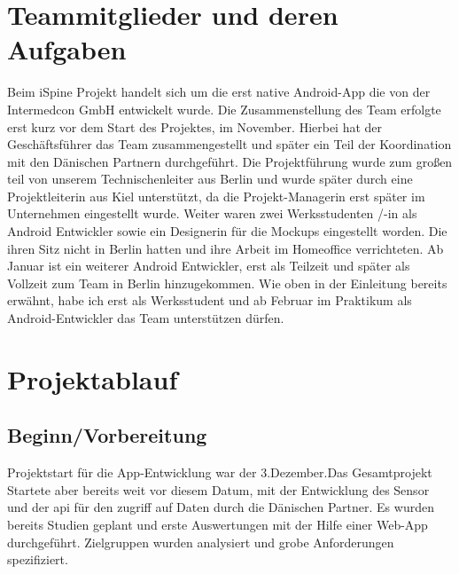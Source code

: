 
\section{Teammitglieder und deren Aufgaben}\label{team}
Beim iSpine Projekt handelt sich um die erst native Android-App die von der Intermedcon GmbH entwickelt wurde. Die Zusammenstellung des  Team erfolgte erst kurz vor dem Start des Projektes, im November. Hierbei hat der Geschäftsführer das Team zusammengestellt und später ein Teil der Koordination mit den Dänischen Partnern durchgeführt. Die Projektführung wurde zum großen teil von unserem Technischenleiter aus Berlin und wurde später durch eine Projektleiterin aus Kiel unterstützt, da  die Projekt-Managerin erst später im Unternehmen eingestellt wurde. Weiter waren  zwei Werksstudenten /-in als Android Entwickler sowie ein Designerin für die Mockups eingestellt worden. Die ihren Sitz nicht in Berlin hatten und ihre Arbeit im Homeoffice verrichteten. Ab Januar ist ein weiterer Android Entwickler, erst als Teilzeit und später als Vollzeit zum Team in Berlin hinzugekommen. Wie oben in der Einleitung bereits erwähnt, habe ich erst als Werksstudent und ab Februar im Praktikum als Android-Entwickler das Team unterstützen dürfen.
\section{Projektablauf}
\subsection{Beginn/Vorbereitung}\label{kapBegin}
Projektstart für die App-Entwicklung  war der 3.Dezember.Das Gesamtprojekt Startete aber bereits weit vor diesem Datum, mit der Entwicklung des Sensor und der \ac{api} für den zugriff auf Daten durch die Dänischen Partner. Es wurden bereits Studien geplant und erste Auswertungen mit der Hilfe einer Web-App durchgeführt. Zielgruppen wurden analysiert und grobe Anforderungen spezifiziert.

